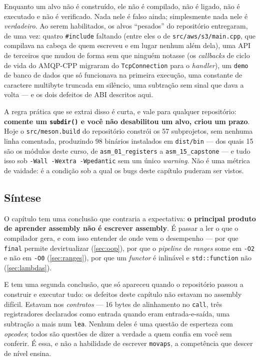 \begin{regra}
Enquanto um alvo não é construído, ele não é compilado, não é ligado, não é
executado e não é verificado. Nada nele é falso ainda; simplesmente nada nele é
\emph{verdadeiro}. Ao serem habilitados, os alvos ``pesados'' do repositório
entregaram, de uma vez: quatro \texttt{\#include} faltando (entre eles o
 de \texttt{src/aws/s3/main.cpp}, que compilava na
cabeça de quem escreveu e em lugar nenhum além dela), uma API de terceiros que
mudou de forma sem que ninguém notasse (os \emph{callbacks} de ciclo de vida do
AMQP-CPP migraram do \texttt{TcpConnection} para o \emph{handler}), um
\texttt{demo} de banco de dados que só funcionava na primeira execução, uma
constante de caractere multibyte truncada em silêncio, uma subtração sem sinal
que dava a volta --- e os dois defeitos de ABI descritos aqui.
\end{regra}

A regra prática que se extrai disso é curta, e vale para qualquer repositório:
\textbf{comente um \texttt{subdir()} e você não desabilitou um alvo, criou um
prazo}. Hoje o \texttt{src/meson.build} do repositório constrói os 57
subprojetos, sem nenhuma linha comentada, produzindo 98 binários instalados em
\texttt{dist/bin} --- dos quais 15 são os módulos deste curso, de
\texttt{asm\_01\_registers} a \texttt{asm\_15\_capstone} --- e tudo isso sob
\texttt{-Wall -Wextra -Wpedantic} sem um único \emph{warning}. Não é uma
métrica de vaidade: é a condição sob a qual os bugs deste capítulo puderam ser
vistos.

\subsection{Síntese}

O capítulo tem uma conclusão que contraria a expectativa: \textbf{o principal
produto de aprender assembly não é escrever assembly}. É passar a ler o que o
compilador gera, e com isso entender de onde vem o desempenho --- por que
\texttt{final} permite devirtualizar (\cref{sec:oop}), por que o \emph{pipeline}
de \emph{ranges} some em \texttt{-O2} e não em \texttt{-O0}
(\cref{sec:ranges}), por que um \emph{functor} é inlinável e
\texttt{std::function} não (\cref{sec:lambdas}).

E tem uma segunda conclusão, que só apareceu quando o repositório passou a
construir e executar tudo: os defeitos deste capítulo não estavam no assembly
difícil. Estavam nos \emph{contratos} --- 16 bytes de alinhamento no
\texttt{call}, três registradores declarados como entrada quando eram
entrada-e-saída, uma subtração a mais num \texttt{lea}. Nenhum deles é uma
questão de esperteza com \emph{opcodes}; todos são questões de dizer a verdade
a quem confia em você sem conferir. É essa, e não a habilidade de escrever
\texttt{movaps}, a competência que descer de nível ensina.

